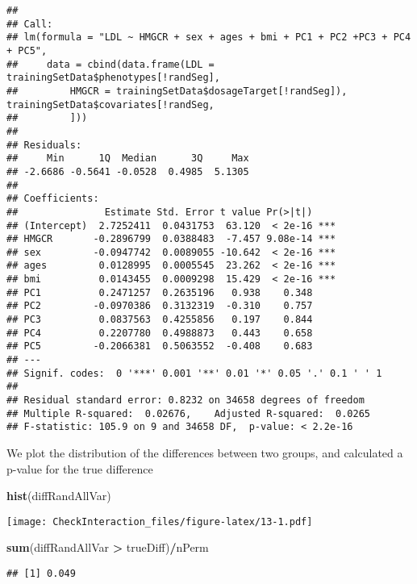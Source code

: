 \documentclass[]{article}
\newenvironment{Shaded}{\begin{snugshade}}{\end{snugshade}}
\newcommand{\KeywordTok}[1]{\textcolor[rgb]{0.13,0.29,0.53}{\textbf{#1}}}
\newcommand{\StringTok}[1]{\textcolor[rgb]{0.31,0.60,0.02}{#1}}
\newcommand{\OperatorTok}[1]{\textcolor[rgb]{0.81,0.36,0.00}{\textbf{#1}}}
\newcommand{\NormalTok}[1]{#1}
\begin{document}
\begin{verbatim}
## 
## Call:
## lm(formula = "LDL ~ HMGCR + sex + ages + bmi + PC1 + PC2 +PC3 + PC4 + PC5", 
##     data = cbind(data.frame(LDL = trainingSetData$phenotypes[!randSeg], 
##         HMGCR = trainingSetData$dosageTarget[!randSeg]), trainingSetData$covariates[!randSeg, 
##         ]))
## 
## Residuals:
##     Min      1Q  Median      3Q     Max 
## -2.6686 -0.5641 -0.0528  0.4985  5.1305 
## 
## Coefficients:
##               Estimate Std. Error t value Pr(>|t|)    
## (Intercept)  2.7252411  0.0431753  63.120  < 2e-16 ***
## HMGCR       -0.2896799  0.0388483  -7.457 9.08e-14 ***
## sex         -0.0947742  0.0089055 -10.642  < 2e-16 ***
## ages         0.0128995  0.0005545  23.262  < 2e-16 ***
## bmi          0.0143455  0.0009298  15.429  < 2e-16 ***
## PC1          0.2471257  0.2635196   0.938    0.348    
## PC2         -0.0970386  0.3132319  -0.310    0.757    
## PC3          0.0837563  0.4255856   0.197    0.844    
## PC4          0.2207780  0.4988873   0.443    0.658    
## PC5         -0.2066381  0.5063552  -0.408    0.683    
## ---
## Signif. codes:  0 '***' 0.001 '**' 0.01 '*' 0.05 '.' 0.1 ' ' 1
## 
## Residual standard error: 0.8232 on 34658 degrees of freedom
## Multiple R-squared:  0.02676,    Adjusted R-squared:  0.0265 
## F-statistic: 105.9 on 9 and 34658 DF,  p-value: < 2.2e-16
\end{verbatim}

We plot the distribution of the differences between two groups, and
calculated a p-value for the true difference

\begin{Shaded}
\begin{Highlighting}[]
\KeywordTok{hist}\NormalTok{(diffRandAllVar)}
\end{Highlighting}
\end{Shaded}

\texttt{[image: CheckInteraction\_files/figure-latex/13-1.pdf]}

\begin{Shaded}
\begin{Highlighting}[]
\KeywordTok{sum}\NormalTok{(diffRandAllVar }\OperatorTok{>}\StringTok{ }\NormalTok{trueDiff)}\OperatorTok{/}\NormalTok{nPerm}
\end{Highlighting}
\end{Shaded}

\begin{verbatim}
## [1] 0.049
\end{verbatim}
\end{document}
